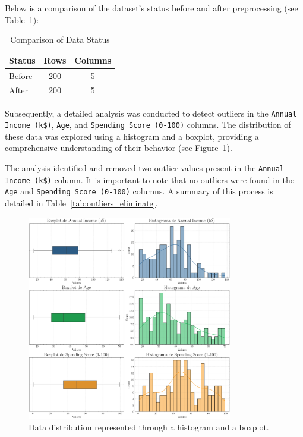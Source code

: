 \documentclass[10pt]{article}
\begin{document}
Below is a comparison of the dataset's status before and after preprocessing (see Table~\ref{tab:estado_datos}):

\begin{table}[h]
    \centering
    \caption{Comparison of Data Status}
    \label{tab:estado_datos}
    \begin{tabular}{lcc}
        \toprule
        \textbf{Status} & \textbf{Rows} & \textbf{Columns} \\
        \midrule
        Before   & 200 & 5 \\
        After & 200 & 5 \\
        \bottomrule
    \end{tabular}
\end{table}

Subsequently, a detailed analysis was conducted to detect outliers in the \texttt{Annual Income (k\$)}, \texttt{Age}, and \texttt{Spending Score (0-100)} columns. The distribution of these data was explored using a histogram and a boxplot, providing a comprehensive understanding of their behavior (see Figure~\ref{fig:miGrafico}).

The analysis identified and removed two outlier values present in the \texttt{Annual Income (k\$)} column. It is important to note that no outliers were found in the \texttt{Age} and \texttt{Spending Score (0-100)} columns. A summary of this process is detailed in Table~\ref{tab:outliers_eliminate}.
\begin{figure}[h]
    \centering
    \includegraphics[width=0.8\textwidth]{plots_investing/Grafico 1.png}
    \caption{Data distribution represented through a histogram and a boxplot.}
    \label{fig:miGrafico}
\end{figure}
\end{document}
